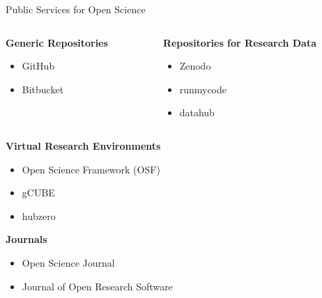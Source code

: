 \documentclass{beamer}
\begin{document}
\begin{frame}{Public Services for Open Science}

\begin{columns}[T]
\begin{column}{.45\linewidth}
\textbf{Generic Repositories}
\begin{itemize}
\item GitHub
\item Bitbucket
\end{itemize}
\end{column}
%
\begin{column}{.45\linewidth}
\textbf{Repositories for Research Data}
\begin{itemize}
\item Zenodo
\item runmycode
\item datahub
\end{itemize}
\end{column}
\end{columns}

\vfill

\textbf{Virtual Research Environments}
\begin{itemize}
\item Open Science Framework (OSF)
\item gCUBE
\item hubzero
\end{itemize}

\vfill

\textbf{Journals}
\begin{itemize}
\item Open Science Journal
\item Journal of Open Research Software
\end{itemize}

\end{frame}
\end{document}
